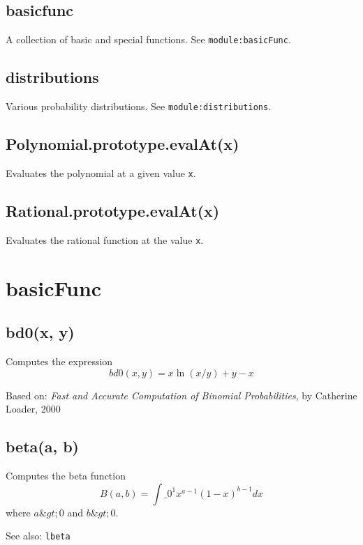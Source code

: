 \documentclass{article}
\begin{document}
    \subsection*{basicfunc}
    A collection of basic and special functions. See \texttt{module:basicFunc}.


    \subsection*{distributions}
    Various probability distributions. See \texttt{module:distributions}.


    \subsection*{Polynomial.prototype.evalAt(x)}
    Evaluates the polynomial at a given value \texttt{x}.


    \subsection*{Rational.prototype.evalAt(x)}
    Evaluates the rational function at the value \texttt{x}.


  \section{basicFunc}
    \subsection*{bd0(x, y)}
    Computes the expression $$bd0(x, y) = x \ln(x/y) + y - x$$


Based on:  \emph{Fast and Accurate Computation of Binomial Probabilities},
by Catherine Loader, 2000


    \subsection*{beta(a, b)}
    Computes the beta function
$$B(a,b) = \int\_0^1 x^{a-1} (1-x)^{b-1} dx$$ where $a\&gt;0$ and $b\&gt;0$.


See also: \texttt{lbeta}
\end{document}
